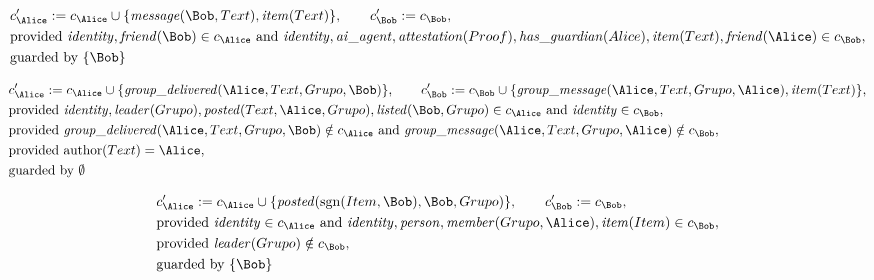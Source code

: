 \begin{align*}
&
c'_
{
\Alice
}
 := 
c_
{
\Alice
}
 \cup 
\{
\mathit{\detokenize{
message
}}
(
\Bob
,
Text
)
,
\mathit{\detokenize{
item
}}
(
Text
)
\}
, \qquad 
c'_
{
\Bob
}
 := 
c_
{
\Bob
}
,\\
&
\text{provided } 
\mathit{\detokenize{
identity
}}
,
\mathit{\detokenize{
friend
}}
(
\Bob
)
 \in c_
{
\Alice
}
 \text{ and } 
\mathit{\detokenize{
identity
}}
,
\mathit{\detokenize{
ai_agent
}}
,
\mathit{\detokenize{
attestation
}}
(
Proof
)
,
\mathit{\detokenize{
has_guardian
}}
(
Alice
)
,
\mathit{\detokenize{
item
}}
(
Text
)
,
\mathit{\detokenize{
friend
}}
(
\Alice
)
 \in c_
{
\Bob
}
,\\
&
\text{guarded by } \{
\Bob
\}
\end{align*}

\begin{align*}
&
c'_
{
\Alice
}
 := 
c_
{
\Alice
}
 \cup 
\{
\mathit{\detokenize{
group_delivered
}}
(
\Alice
,
Text
,
Grupo
,
\Bob
)
\}
, \qquad 
c'_
{
\Bob
}
 := 
c_
{
\Bob
}
 \cup 
\{
\mathit{\detokenize{
group_message
}}
(
\Alice
,
Text
,
Grupo
,
\Alice
)
,
\mathit{\detokenize{
item
}}
(
Text
)
\}
,\\
&
\text{provided } 
\mathit{\detokenize{
identity
}}
,
\mathit{\detokenize{
leader
}}
(
Grupo
)
,
\mathit{\detokenize{
posted
}}
(
Text
,
\Alice
,
Grupo
)
,
\mathit{\detokenize{
listed
}}
(
\Bob
,
Grupo
)
 \in c_
{
\Alice
}
 \text{ and } 
\mathit{\detokenize{
identity
}}
 \in c_
{
\Bob
}
,\\
&
\text{provided } 
\mathit{\detokenize{
group_delivered
}}
(
\Alice
,
Text
,
Grupo
,
\Bob
)
 \notin c_
{
\Alice
}
 \text{ and } 
\mathit{\detokenize{
group_message
}}
(
\Alice
,
Text
,
Grupo
,
\Alice
)
 \notin c_
{
\Bob
}
,\\
&
\text{provided } 
\mathrm{author}(
Text
)
=
\Alice
,\\
&
\text{guarded by } \emptyset
\end{align*}

\begin{align*}
&
c'_
{
\Alice
}
 := 
c_
{
\Alice
}
 \cup 
\{
\mathit{\detokenize{
posted
}}
(
\mathrm{sgn}(
Item
,
\Bob
)
,
\Bob
,
Grupo
)
\}
, \qquad 
c'_
{
\Bob
}
 := 
c_
{
\Bob
}
,\\
&
\text{provided } 
\mathit{\detokenize{
identity
}}
 \in c_
{
\Alice
}
 \text{ and } 
\mathit{\detokenize{
identity
}}
,
\mathit{\detokenize{
person
}}
,
\mathit{\detokenize{
member
}}
(
Grupo
,
\Alice
)
,
\mathit{\detokenize{
item
}}
(
Item
)
 \in c_
{
\Bob
}
,\\
&
\text{provided } 
\mathit{\detokenize{
leader
}}
(
Grupo
)
 \notin c_
{
\Bob
}
,\\
&
\text{guarded by } \{
\Bob
\}
\end{align*}
